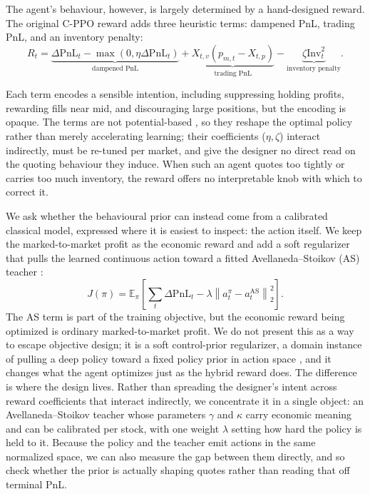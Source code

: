 \documentclass{article}
\newcommand{\E}{\mathbb{E}}
\begin{document}
The agent's behaviour, however, is largely determined by a hand-designed reward. The original C-PPO reward adds three heuristic terms: dampened PnL, trading PnL, and an inventory penalty:
\begin{equation}
R_t
= \underbrace{\Delta\mathrm{PnL}_t-\max(0,\eta\Delta\mathrm{PnL}_t)}_{\text{dampened PnL}}
+ \underbrace{X_{t,v}(p_{m,t}-X_{t,p})}_{\text{trading PnL}}
- \underbrace{\zeta \mathrm{Inv}_t^2}_{\text{inventory penalty}} .
\label{eq:hybrid}
\end{equation}

Each term encodes a sensible intention, including suppressing holding profits, rewarding fills near mid, and discouraging large positions, but the encoding is opaque. The terms are not potential-based \citep{ng1999}, so they reshape the optimal policy rather than merely accelerating learning; their coefficients ($\eta,\zeta$) interact indirectly, must be re-tuned per market, and give the designer no direct read on the quoting behaviour they induce. When such an agent quotes too tightly or carries too much inventory, the reward offers no interpretable knob with which to correct it.

We ask whether the behavioural prior can instead come from a calibrated classical model, expressed where it is easiest to inspect: the action itself. We keep the marked-to-market profit as the economic reward and add a soft regularizer that pulls the learned continuous action toward a fitted Avellaneda--Stoikov (AS) teacher \citep{avellaneda2008}:
\begin{equation}
J(\pi)
= \E_{\pi}\!\left[\sum_t \Delta\mathrm{PnL}_t
- \lambda \left\lVert a^\pi_t-a^{\mathrm{AS}}_t \right\rVert_2^2 \right].
\label{eq:softas}
\end{equation}
The AS term is part of the training objective, but the economic reward being optimized is ordinary marked-to-market profit. We do not present this as a way to escape objective design; it is a soft control-prior regularizer, a domain instance of pulling a deep policy toward a fixed policy prior in action space \citep{cheng2019control}, and it changes what the agent optimizes just as the hybrid reward does. The difference is where the design lives. Rather than spreading the designer's intent across reward coefficients that interact indirectly, we concentrate it in a single object: an Avellaneda--Stoikov teacher whose parameters $\gamma$ and $\kappa$ carry economic meaning and can be calibrated per stock, with one weight $\lambda$ setting how hard the policy is held to it. Because the policy and the teacher emit actions in the same normalized space, we can also measure the gap between them directly, and so check whether the prior is actually shaping quotes rather than reading that off terminal PnL.
\end{document}
